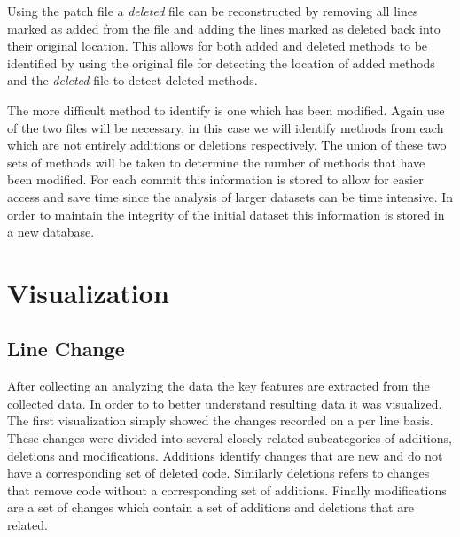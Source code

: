 Using the patch file a \textit{deleted} file can be reconstructed by removing all lines marked as added from the file and adding the lines marked as deleted back into their original location. This allows for both added and deleted methods to be identified by using the original file for detecting the location of added methods and the \textit{deleted} file to detect deleted methods.


The more difficult method to identify is one which has been modified. Again use of the two files will be necessary, in this case we will identify methods from each which are not entirely additions or deletions respectively. The union of these two sets of methods will be taken to determine the number of methods that have been modified. For each commit this information is stored to allow for easier access and save time since the analysis of larger datasets can be time intensive. In order to maintain the integrity of the initial dataset this information is stored in a new database.



\section{Visualization}

\subsection{Line Change}

After collecting an analyzing the data the key features are extracted from the collected data. In order to to better understand resulting data it was visualized. The first visualization simply showed the changes recorded on a per line basis. These changes were divided into several closely related subcategories of additions, deletions and modifications. Additions identify changes that are new and do not have a corresponding set of deleted code. Similarly deletions refers to changes that remove code without a corresponding set of additions. Finally modifications are a set of changes which contain a set of additions and deletions that are related.

